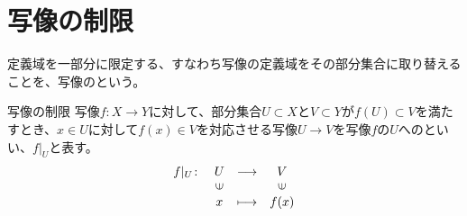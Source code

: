 \documentclass[../../../topic_linear-algebra]{subfiles}
\begin{document}
\sectionline
\section{写像の制限}

定義域を一部分に限定する、すなわち写像の定義域をその部分集合に取り替えることを、写像のという。

\begin{definition*}{写像の制限}
  写像$f\colon X \to Y$に対して、部分集合$U \subset X$と$V \subset Y$が$f(U) \subset V$を満たすとき、$x \in U$に対して$f(x) \in V$を対応させる写像$U \to V$を写像$f$の$U$へのといい、$f|_U$と表す。
  \begin{equation*}
  \begin{array}{lclc}
    f|_U \colon & U         & \longrightarrow & V          \\
            & \rotatebox{90}{$\in$} &                 & \rotatebox{90}{$\in$} \\
            & x              & \longmapsto     & f(x)
  \end{array}
\end{equation*}
\end{definition*}
\end{document}

